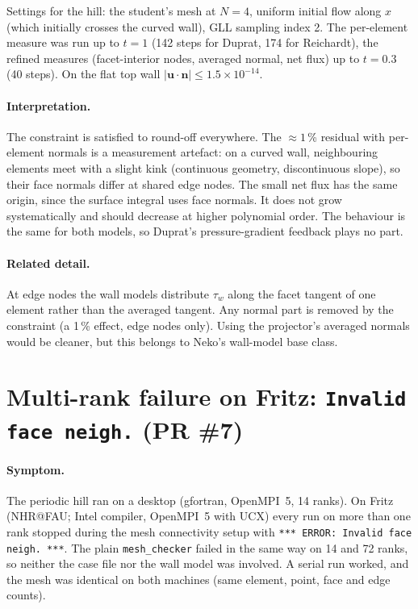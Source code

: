 \documentclass[11pt,a4paper]{article}
\newcommand{\code}[1]{\texttt{#1}}
\begin{document}
\noindent Settings for the hill: the student's mesh at $N=4$, uniform
initial flow along $x$ (which initially crosses the curved wall), GLL
sampling index 2. The per-element measure was run up to $t = 1$ (142 steps
for Duprat, 174 for Reichardt), the refined measures (facet-interior nodes,
averaged normal, net flux) up to $t = 0.3$ (40 steps). On the flat top wall
$|\mathbf{u}\cdot\mathbf{n}| \le 1.5\times10^{-14}$.

\paragraph{Interpretation.} The constraint is satisfied to round-off
everywhere. The $\approx1$\,\% residual with per-element normals is a
measurement artefact: on a curved wall, neighbouring elements meet with a
slight kink (continuous geometry, discontinuous slope), so their face
normals differ at shared edge nodes. The small net flux has the same origin,
since the surface integral uses face normals. It does not grow
systematically and should decrease at higher polynomial order. The behaviour
is the same for both models, so Duprat's pressure-gradient feedback plays
no part.

\paragraph{Related detail.} At edge nodes the wall models distribute
$\tau_w$ along the facet tangent of one element rather than the averaged
tangent. Any normal part is removed by the constraint (a 1\,\% effect, edge
nodes only). Using the projector's averaged normals would be cleaner, but
this belongs to Neko's wall-model base class.

\section{Multi-rank failure on Fritz: \code{Invalid face neigh.} (PR \#7)}
\label{sec:pr7}

\paragraph{Symptom.} The periodic hill ran on a desktop (gfortran, OpenMPI~5,
14 ranks). On Fritz (NHR@FAU; Intel compiler, OpenMPI~5 with UCX) every run on
more than one rank stopped during the mesh connectivity setup with
\code{*** ERROR: Invalid face neigh. ***}. The plain \code{mesh\_checker}
failed in the same way on 14 and 72 ranks, so neither the case file nor the
wall model was involved. A serial run worked, and the mesh was identical on
both machines (same element, point, face and edge counts).
\end{document}
